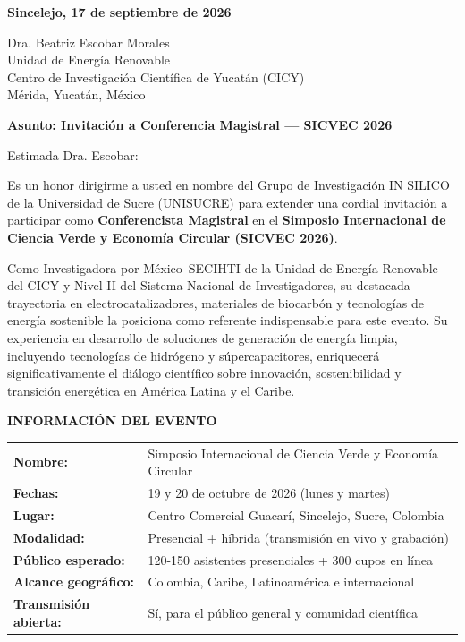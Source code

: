 \documentclass[12pt,a4paper]{article}
\begin{document}
\vspace{0.5cm}

\noindent
\textbf{Sincelejo, 17 de septiembre de 2026}

\vspace{0.8cm}

\noindent
Dra. Beatriz Escobar Morales\\
Unidad de Energía Renovable\\
Centro de Investigación Científica de Yucatán (CICY)\\
Mérida, Yucatán, México

\vspace{0.8cm}

\noindent
\textbf{\large Asunto: Invitación a Conferencia Magistral — SICVEC 2026}

\vspace{0.8cm}

Estimada Dra. Escobar:

\vspace{0.8cm}

Es un honor dirigirme a usted en nombre del Grupo de Investigación IN SILICO de la Universidad de Sucre (UNISUCRE) para extender una cordial invitación a participar como \textbf{Conferencista Magistral} en el \textbf{Simposio Internacional de Ciencia Verde y Economía Circular (SICVEC 2026)}.

Como Investigadora por México–SECIHTI de la Unidad de Energía Renovable del CICY y Nivel II del Sistema Nacional de Investigadores, su destacada trayectoria en electrocatalizadores, materiales de biocarbón y tecnologías de energía sostenible la posiciona como referente indispensable para este evento. Su experiencia en desarrollo de soluciones de generación de energía limpia, incluyendo tecnologías de hidrógeno y súpercapacitores, enriquecerá significativamente el diálogo científico sobre innovación, sostenibilidad y transición energética en América Latina y el Caribe.

\vspace{0.5cm}

\noindent
\textbf{INFORMACIÓN DEL EVENTO}

\begin{tabular}{ll}
\textbf{Nombre:} & Simposio Internacional de Ciencia Verde y Economía Circular \\
\textbf{Fechas:} & 19 y 20 de octubre de 2026 (lunes y martes) \\
\textbf{Lugar:} & Centro Comercial Guacarí, Sincelejo, Sucre, Colombia \\
\textbf{Modalidad:} & Presencial + híbrida (transmisión en vivo y grabación) \\
\textbf{Público esperado:} & 120-150 asistentes presenciales + 300 cupos en línea \\
\textbf{Alcance geográfico:} & Colombia, Caribe, Latinoamérica e internacional \\
\textbf{Transmisión abierta:} & Sí, para el público general y comunidad científica \\
\end{tabular}
\end{document}
